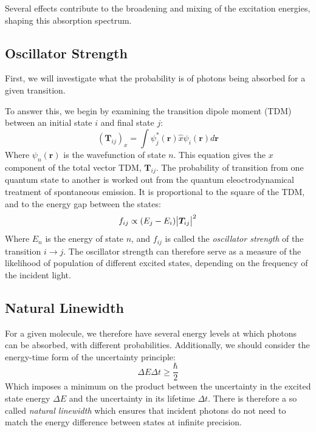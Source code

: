 Several effects contribute to the broadening and mixing of the excitation energies, shaping this absorption spectrum.

\subsection{Oscillator Strength}
\label{sec:osci}
First, we will investigate what the probability is of photons being absorbed for a given transition.

To answer this, we begin by examining the transition dipole moment (TDM) between an initial state $i$ and final state $j$:
\begin{equation}
    (\bm{T}_{ij})_x = \int \psi^*_j(\bm{r}) \hat{x} \psi_i(\bm{r}) d\bm{r}
    \label{eq:tdm}
\end{equation}
Where $\psi_n(\bm{r})$ is the wavefunction of state $n$. This equation gives the $x$ component of the total vector TDM, $\bm{T}_{ij}$. The probability of transition from one quantum state to another is worked out from the quantum eleoctrodynamical treatment of spontaneous emission. It is
proportional to the square of the TDM, and to the energy gap between the states:\cite{Hilborn1982}
\begin{equation}
    f_{ij} \propto (E_j - E_i) \abs{\bm{T}_{ij}}^2
\end{equation}
Where $E_n$ is the energy of state $n$, and $f_{ij}$ is called the \textit{oscillator strength} of the transition $i \rightarrow j$. The oscillator strength can therefore serve as a measure of the likelihood of population of different excited states, depending on the frequency of the incident light.

\subsection{Natural Linewidth}

For a given molecule, we therefore have several energy levels at which photons can be absorbed, with different probabilities. Additionally, we should consider the energy-time form of the uncertainty principle:
\begin{equation}
    \Delta E \Delta t \geq \frac{\hbar}{2}
\end{equation}
Which imposes a minimum on the product between the uncertainty in the excited state energy $\Delta E$ and the uncertainty in its lifetime $\Delta t$. There is therefore a so called \textit{natural linewidth} which ensures that incident photons do not need to match the energy difference between states at infinite precision.


